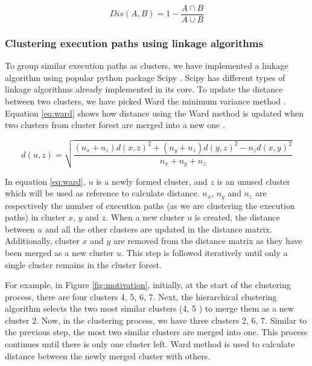 \begin{equation}
Dis(A, B) = 1 - \frac{A\cap B}{A\cup B}
\label{eq:jaccard}
\end{equation}

\subsubsection{Clustering execution paths using linkage algorithms}

To group similar execution paths as clusters, we have implemented a linkage algorithm using popular python package Scipy \cite{scipy}. Scipy has different types of linkage algorithms already implemented in its core. To update the distance between two clusters, we have picked Ward the minimum variance method \cite{ward}. Equation \ref{eq:ward} shows how distance using the Ward method is updated when two clusters from cluster forest are merged into a new one \cite{scipy}.

\begin{equation}
     d(u, z) =   \sqrt{\frac{(n_x+n_z)d(x,z)^2+ (n_y+n_z)d(y,z)^2 - n_z d(x,y)^2 }{n_x+n_y+n_z}}
    \label{eq:ward}
\end{equation}

 
In equation \ref{eq:ward}, $u$ is a newly formed cluster, and $z$ is an unused cluster which will be used as reference to calculate distance. $n_x$, $n_y$ and $n_z$ are respectively the number of execution paths (as we are clustering the execution paths) in cluster $x$, $y$ and $z$.
When a new cluster $u$ is created, the distance between $u$ and all the other clusters are updated in the distance matrix. Additionally, cluster $x$ and $y$ are removed from the distance matrix as they have been merged as a new cluster $u$. This step is followed iteratively until only a single cluster remains in the cluster forest. 

For example, in Figure \ref{fig:motivation}, initially, at the start of the clustering process, there are four clusters 4, 5, 6, 7. Next, the hierarchical clustering algorithm selects the two most similar clusters (4, 5 ) to merge them as a new cluster 2. Now, in the clustering process, we have three clusters 2, 6, 7. Similar to the previous step, the most two similar clusters are merged into one. This process continues until there is only one cluster left. Ward method is used to calculate distance between the newly merged cluster with others.


